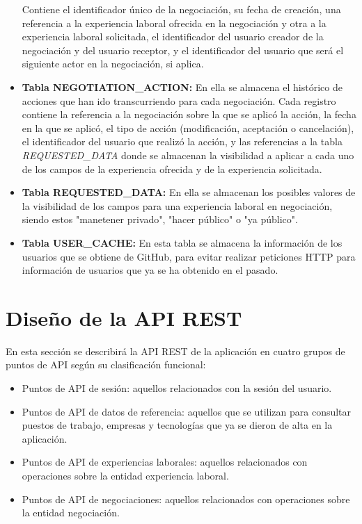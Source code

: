 \documentclass[a4paper, 12pt]{book}
\begin{document}
\begin{itemize}
        Contiene el identificador único de la negociación, su fecha de creación, una referencia a la experiencia laboral ofrecida en la negociación y otra a la experiencia laboral solicitada, el identificador del usuario creador de la negociación y del usuario receptor, y el identificador del usuario que será el siguiente actor en la negociación, si aplica.
        \item \textbf{Tabla NEGOTIATION\_ACTION:} En ella se almacena el histórico de acciones que han ido transcurriendo para cada negociación.
        Cada registro contiene la referencia a la negociación sobre la que se aplicó la acción, la fecha en la que se aplicó, el tipo de acción (modificación, aceptación o cancelación), el identificador del usuario que realizó la acción,
        y las referencias a la tabla \emph{REQUESTED\_DATA} donde se almacenan la visibilidad a aplicar a cada uno de los campos de la experiencia ofrecida y de la experiencia solicitada.
        \item \textbf{Tabla REQUESTED\_DATA:} En ella se almacenan los posibles valores de la visibilidad de los campos para una experiencia laboral en negociación, siendo estos "manetener privado", "hacer público" o "ya público".
        \item \textbf{Tabla USER\_CACHE:} En esta tabla se almacena la información de los usuarios que se obtiene de GitHub, para evitar realizar peticiones HTTP para información de usuarios que ya se ha obtenido en el pasado.
    \end{itemize}


    \section{Diseño de la API REST}
    \label{sec:api_desing}
    En esta sección se describirá la API REST de la aplicación en cuatro grupos de puntos de API según su clasificación funcional:

    \begin{itemize}
        \item Puntos de API de sesión: aquellos relacionados con la sesión del usuario.
        \item Puntos de API de datos de referencia: aquellos que se utilizan para consultar puestos de trabajo, empresas y tecnologías que ya se dieron de alta en la aplicación.
        \item Puntos de API de experiencias laborales: aquellos relacionados con operaciones sobre la entidad experiencia laboral.
        \item Puntos de API de negociaciones: aquellos relacionados con operaciones sobre la entidad negociación.
    \end{itemize}
\end{document}
